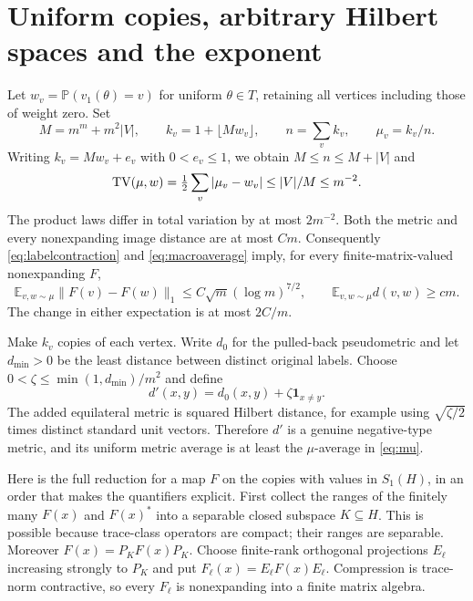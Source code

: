 \documentclass[11pt]{article}
\theoremstyle{remark}\newtheorem{remark}[theorem]{Remark}
\numberwithin{equation}{section}
\newcommand{\E}{\mathbb E}\newcommand{\Prob}{\mathbb P}
\newcommand{\norm}[1]{\lVert #1\rVert}
\begin{document}
\section{Uniform copies, arbitrary Hilbert spaces and the exponent}
\label{sec:completion}
Let $w_v=\Prob(v_1(\theta)=v)$ for uniform $\theta\in T$, retaining all
vertices including those of weight zero. Set
\[
 M=m^m+m^2|V|,\qquad k_v=1+\lfloor Mw_v\rfloor,\qquad
 n=\sum_vk_v,\qquad \mu_v=k_v/n.
\]
Writing $k_v=Mw_v+e_v$ with $0<e_v\le1$, we obtain
$M\le n\le M+|V|$ and
\[
 \operatorname{TV}(\mu,w)=\tfrac12\sum_v|\mu_v-w_v|
 \le |V|/M\le m^{-2}.
\]
The product laws differ in total variation by at most $2m^{-2}$.
Both the metric and every nonexpanding image distance are at most $Cm$.
Consequently \eqref{eq:labelcontraction} and \eqref{eq:macroaverage}
imply, for every finite-matrix-valued nonexpanding $F$,
\begin{equation}\label{eq:mu}
 \E_{v,w\sim\mu}\norm{F(v)-F(w)}_1\le C\sqrt m(\log m)^{7/2},
 \qquad \E_{v,w\sim\mu}d(v,w)\ge cm.
\end{equation}
The change in either expectation is at most $2C/m$.

Make $k_v$ copies of each vertex. Write $d_0$ for the pulled-back
pseudometric and let $d_{\min}>0$ be the least distance between distinct
original labels. Choose
$0<\zeta\le\min(1,d_{\min})/m^2$ and define
\[
 d'(x,y)=d_0(x,y)+\zeta\mathbf1_{x\ne y}.
\]
The added equilateral metric is squared Hilbert distance, for example
using $\sqrt{\zeta/2}$ times distinct standard unit vectors. Therefore
$d'$ is a genuine negative-type metric, and its uniform metric average
is at least the $\mu$-average in \eqref{eq:mu}.

Here is the full reduction for a map $F$ on the copies with values in
$S_1(H)$, in an order that makes the quantifiers explicit. First collect
the ranges of the finitely many $F(x)$ and $F(x)^*$ into a separable
closed subspace $K\subseteq H$. This is possible because trace-class
operators are compact; their ranges are separable. Moreover
$F(x)=P_KF(x)P_K$. Choose finite-rank orthogonal projections $E_\ell$
increasing strongly to $P_K$ and put $F_\ell(x)=E_\ell F(x)E_\ell$.
Compression is trace-norm contractive, so every $F_\ell$ is nonexpanding
into a finite matrix algebra.
\end{document}
